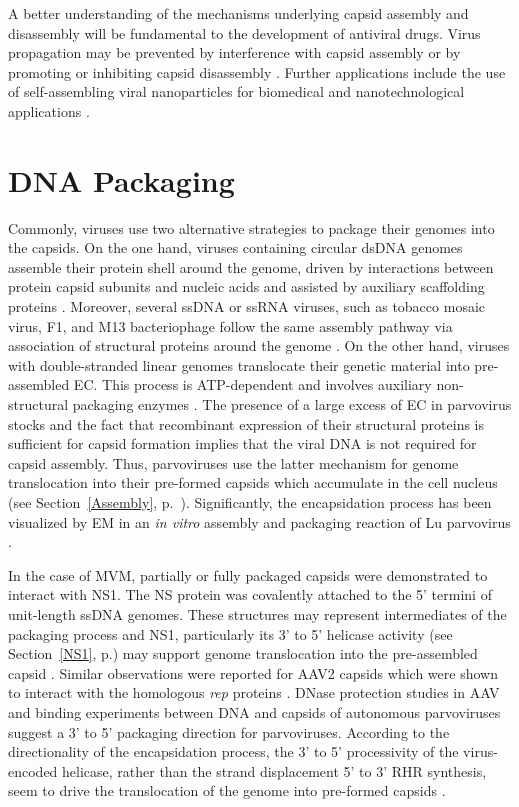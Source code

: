 A better understanding of the mechanisms underlying capsid assembly and disassembly will be fundamental to the development of antiviral drugs. Virus propagation may be prevented by interference with capsid assembly or by promoting or inhibiting capsid disassembly \cite{pmid21762804, pmid21163649}. Further applications include the use of self-assembling viral nanoparticles for biomedical and nanotechnological applications \cite{pmid16521330, pmid16690856}.     


  
\section{DNA Packaging}
\label{Packaging}

Commonly, viruses use two alternative strategies to package their genomes into the capsids. On the one hand, viruses containing circular dsDNA genomes assemble their protein shell around the genome, driven by interactions between protein capsid subunits and nucleic acids and assisted by auxiliary scaffolding proteins \cite{pmid6101085, pmid6305987, pmid1323699}. Moreover, several ssDNA or ssRNA viruses, such as tobacco mosaic virus, F1, and M13 bacteriophage follow the same assembly pathway via association of structural proteins around the genome \cite{pmid11406604}. On the other hand, viruses with double-stranded linear genomes translocate their genetic material into pre-assembled EC. This process is ATP-dependent and involves auxiliary non-structural packaging enzymes \cite{pmid2679356}. The presence of a large excess of EC in parvovirus stocks and the fact that recombinant expression of their structural proteins is sufficient for capsid formation \cite{pmid1331503} implies that the viral DNA is not required for capsid assembly. Thus, parvoviruses use the latter mechanism for genome translocation into their pre-formed capsids which accumulate in the cell nucleus (see Section~\ref{Assembly}, p.~\pageref{Assembly}). Significantly, the encapsidation process has been visualized by EM in an \textit{in vitro} assembly and packaging reaction of Lu parvovirus \cite{pmid6221078}.

In the case of MVM, partially or fully packaged capsids were demonstrated to interact with NS1. The NS protein was covalently attached to the 5' termini of unit-length ssDNA genomes. These structures may represent intermediates of the packaging process and NS1, particularly its 3' to 5' helicase activity (see Section~\ref{NS1}, p.\pageref{NS1}) may support genome translocation into the pre-assembled capsid \cite{pmid2527311}. Similar observations were reported for AAV2 capsids which were shown to interact with the homologous \textit{rep} proteins \cite{pmid8553536, pmid8995658}. DNase protection studies in AAV \cite{pmid11406604} and binding experiments between DNA and capsids of autonomous parvoviruses \cite{pmid2145445, pmid8350419} suggest a 3’ to 5’ packaging direction for parvoviruses. According to the directionality of the encapsidation process, the 3’ to 5’ processivity of the virus-encoded helicase, rather than the strand displacement 5' to 3' RHR synthesis, seem to drive the translocation of the genome into pre-formed capsids \cite{pmid11406604}. 

